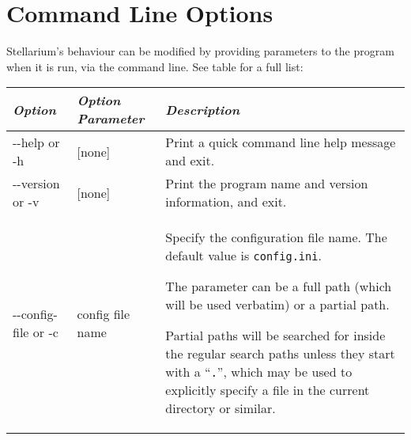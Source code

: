 \chapter{Command Line Options}\label{command-line-options}
\label{sec:CommandLineOptions}

Stellarium's behaviour can be modified by providing parameters to the
program when it is run, via the command line. See table for a full list:

\begin{longtabu} to \textwidth {l|l|X}
\toprule
\emph{Option} & \emph{Option Parameter} & \emph{Description}\tabularnewline
\midrule
-\/-help or -h & {[}none{]} & Print a quick command line help message and exit. \tabularnewline
\midrule
-\/-version or -v & {[}none{]} & Print the program name and version information, and exit. \tabularnewline
\midrule
-\/-config-file or -c & config file name & Specify the configuration file name. The default value is \texttt{config.ini}.

The parameter can be a full path (which will be used verbatim) or a partial path.

Partial paths will be searched for inside the regular search paths
unless they start with a ``\texttt{.}'', which may be used to explicitly
specify a file in the current directory or similar.


\end{longtabu}
